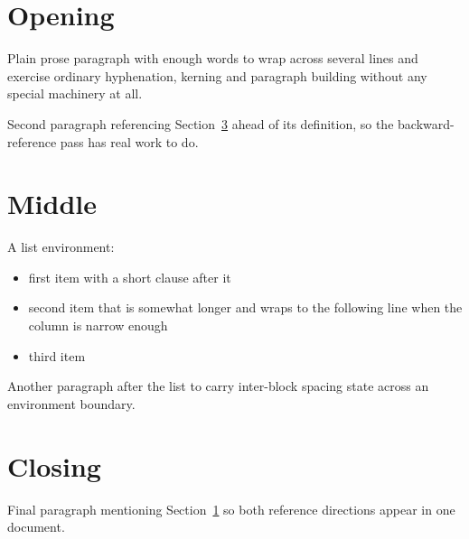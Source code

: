 \documentclass[11pt,a4paper]{article}
\begin{document}
\tableofcontents

\section{Opening}\label{sec:open}

Plain prose paragraph with enough words to wrap across several lines and
exercise ordinary hyphenation, kerning and paragraph building without any
special machinery at all.

Second paragraph referencing Section~\ref{sec:close} ahead of its
definition, so the backward-reference pass has real work to do.

\section{Middle}

A list environment:
\begin{itemize}
  \item first item with a short clause after it
  \item second item that is somewhat longer and wraps to the following line
        when the column is narrow enough
  \item third item
\end{itemize}

Another paragraph after the list to carry inter-block spacing state across
an environment boundary.

\section{Closing}\label{sec:close}

Final paragraph mentioning Section~\ref{sec:open} so both reference
directions appear in one document.
\end{document}
